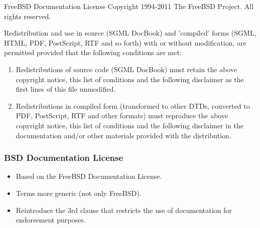 \documentclass{beamer}
\begin{document}
\begin{frame}

\begin{block}{FreeBSD Documentation License} 
Copyright 1994-2011 The FreeBSD Project. All rights reserved. \\

\smallskip

Redistribution and use in source (SGML DocBook) and 'compiled' forms (SGML, HTML, PDF, PostScript, RTF and so forth) with or without modification, are permitted provided that the following conditions are met:

\begin{enumerate}
\item Redistributions of source code (SGML DocBook) must retain the above copyright notice, this list of conditions and the following disclaimer as the first lines of this file unmodified.
\item Redistributions in compiled form (transformed to other DTDs, converted to PDF, PostScript, RTF and other formats) must reproduce the above copyright notice, this list of conditions and the following disclaimer in the documentation and/or other materials provided with the distribution.
\end{enumerate}
 
\end{block}

\end{frame}



\begin{frame}
\frametitle {BSD Documentation License}

\begin{itemize}
\item Based on the FreeBSD Documentation License.
\item Terms more generic (not only FreeBSD).
\item Reintroduce the 3rd clause that restricts the use of documentation for endorsement purposes.
\end{itemize}

\end{frame}

\end{document}
